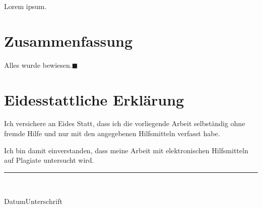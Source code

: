 \documentclass[article, a4paper, oneside, 12pt, toc=listof]{memoir}
\begin{document}
Lorem ipsum.

\section{Zusammenfassung}

Alles wurde bewiesen.\hfill$\blacksquare$


\clearpage

\printbibliography

\clearpage



\thispagestyle{chapter}
\listoffigures
\listoftables
\clearpage



\section*{Eidesstattliche Erklärung}

\OnehalfSpacing

\noindent Ich versichere an Eides Statt, dass ich die vorliegende Arbeit
selbständig ohne fremde Hilfe und nur mit den angegebenen Hilfsmitteln
verfasst habe.

\vspace*{1ex}

\noindent Ich bin damit einverstanden, dass meine Arbeit mit
elektronischen Hilfsmitteln auf Plagiate untersucht wird.

\vspace*{2\baselineskip}

{\noindent\raggedright\rule{\textwidth}{.4pt}\\\raggedright Datum\hfill Unterschrift}

\end{document}
